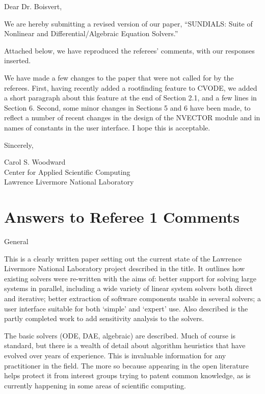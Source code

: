 \documentclass[12pt]{letter}
\begin{document}
\begin{letter}



\opening{Dear Dr. Boisvert,}

We are hereby submitting a revised version of our paper, ``SUNDIALS:
Suite of Nonlinear and Differential/Algebraic Equation Solvers.''

Attached below, we have reproduced the referees' comments, with our
responses inserted.

We have made a few changes to the paper that were not called for
by the referees.  First, having recently added a rootfinding
feature to CVODE, we added a short paragraph about this feature at
the end of Section 2.1, and a few lines in Section 6.  Second,
some minor changes in Sections 5 and 6 have been made, to reflect
a number of recent changes in the design of the NVECTOR module and
in names of constants in the user interface.  I hope this is
acceptable.


\closing{Sincerely,}

Carol S. Woodward\\
Center for Applied Scientific Computing\\
Lawrence Livermore National Laboratory

\end{letter}


\newpage
\section{Answers to Referee 1 Comments}

General

This is a clearly written paper setting out the current state of the
Lawrence Livermore National Laboratory project described in the title.
It outlines how existing solvers were re-written with the aims of:
better support for solving large systems in parallel, including a wide
variety of linear system solvers both direct and iterative; better
extraction of software components usable in several solvers; a user
interface suitable for both `simple' and `expert' use. Also described
is the partly completed work to add sensitivity analysis to the
solvers.

The basic solvers (ODE, DAE, algebraic) are described.  Much of course
is standard, but there is a wealth of detail about algorithm
heuristics that have evolved over years of experience. This is
invaluable information for any practitioner in the field. The more so
because appearing in the open literature helps protect it from
interest groups trying to patent common knowledge, as is currently
happening in some areas of scientific computing.
\end{document}
